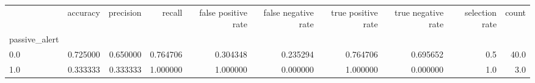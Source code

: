 \begin{tabular}{lrrrrrrrrr}
\toprule
{} &  accuracy &  precision &    recall &  false positive rate &  false negative rate &  true positive rate &  true negative rate &  selection rate &  count \\
passive\_alert &           &            &           &                      &                      &                     &                     &                 &        \\
\midrule
0.0           &  0.725000 &   0.650000 &  0.764706 &             0.304348 &             0.235294 &            0.764706 &            0.695652 &             0.5 &   40.0 \\
1.0           &  0.333333 &   0.333333 &  1.000000 &             1.000000 &             0.000000 &            1.000000 &            0.000000 &             1.0 &    3.0 \\
\bottomrule
\end{tabular}
